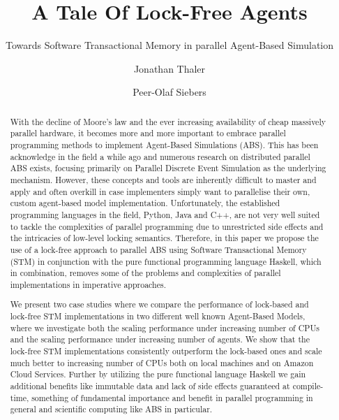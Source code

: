 \documentclass[format=acmsmall, review=true, screen=true]{acmart}
\begin{document}


\title[A Tale Of Lock-Free Agents]{A Tale Of Lock-Free Agents}
\subtitle{Towards Software Transactional Memory in parallel Agent-Based Simulation}

\author{Jonathan Thaler}
\author{Peer-Olaf Siebers}

\begin{abstract}
With the decline of Moore's law and the ever increasing availability of cheap massively parallel hardware, it becomes more and more important to embrace parallel programming methods to implement Agent-Based Simulations (ABS). This has been acknowledge in the field a while ago and numerous research on distributed parallel ABS exists, focusing primarily on Parallel Discrete Event Simulation as the underlying mechanism. However, these concepts and tools are inherently difficult to master and apply and often overkill in case implementers simply want to parallelise their own, custom agent-based model implementation. Unfortunately, the established programming languages in the field, Python, Java and C++, are not very well suited to tackle the complexities of parallel programming due to unrestricted side effects and the intricacies of low-level locking semantics. Therefore, in this paper we propose the use of a lock-free approach to parallel ABS using Software Transactional Memory (STM) in conjunction with the pure functional programming language Haskell, which in combination, removes some of the problems and complexities of parallel implementations in imperative approaches.

We present two case studies where we compare the performance of lock-based and lock-free STM implementations in two different well known Agent-Based Models, where we investigate both the scaling performance under increasing number of CPUs and the scaling performance under increasing number of agents. We show that the lock-free STM implementations consistently outperform the lock-based ones and scale much better to increasing number of CPUs both on local machines and on Amazon Cloud Services. Further by utilizing the pure functional language Haskell we gain additional benefits like immutable data and lack of side effects guaranteed at compile-time, something of fundamental importance and benefit in parallel programming in general and scientific computing like ABS in particular.
\end{abstract}
\end{document}

